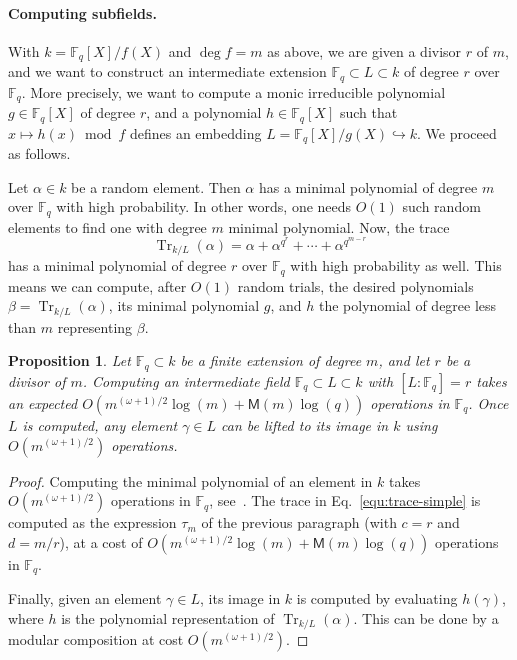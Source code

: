 \documentclass{mcom-l}
\theoremstyle{plain}
\newtheorem{proposition}[theorem]{Proposition}
\theoremstyle{definition}
\DeclareMathOperator{\trace}{Tr} %
\newcommand{\F}{\ensuremath{\mathbb{F}}}
\newcommand{\MM}{\ensuremath{\mathsf{M}}}
\begin{document}
\paragraph{\bf Computing subfields.}
With $k = \F_q[X]/f(X)$ and $\deg f=m$ as above, we are given a
divisor $r$ of $m$, and we want to construct an intermediate extension
$\F_q \subset L \subset k$ of degree $r$ over $\F_q$. More precisely,
we want to compute a monic irreducible polynomial $g \in \F_q[X]$ of
degree $r$, and a polynomial $h \in \F_q[X]$ such that
$x \mapsto h(x)\bmod f$ defines an embedding
$L = \F_q[X] / g(X) \hookrightarrow k$. We proceed as follows.

Let $\alpha\in k$ be a random element. Then $\alpha$ has a minimal polynomial of degree $m$ 
over $\F_q$ with high probability. In other words, one needs $O(1)$ such random elements to find 
one with degree $m$ minimal polynomial. Now, the trace
\begin{equation}
	\label{equ:trace-simple}
	\trace_{k/L}(\alpha) = \alpha + \alpha^{q^r} + \cdots + \alpha^{q^{m - r}}
\end{equation}
has a minimal polynomial of degree $r$ over $\F_q$ with high
probability as well. This means we can compute, after $O(1)$ random
trials, the desired polynomials $\beta = \trace_{k/L}(\alpha)$,
its minimal polynomial
$g$, and $h$ the polynomial of degree less than $m$ representing $\beta$.

\begin{proposition}
	\label{prop:subfield}
	Let $\F_q \subset k$ be a finite extension of degree $m$, and
        let $r$ be a divisor of $m$.  Computing an intermediate field
        $\F_q \subset L \subset k$ with $[L:\F_q]=r$ takes an expected
        $O(m^{(\omega+1)/2}\log(m) + \MM(m)\log(q))$ operations in $\F_q$.  Once
        $L$ is computed, any element $\gamma\in L$ can be lifted to
        its image in $k$ using $O(m^{(\omega+1)/2})$ operations.
\end{proposition}
\begin{proof}
  Computing the minimal polynomial of an element in $k$ takes
  $O(m^{(\omega+1)/2})$ operations in $\F_q$, see~\cite{shoup93}. %
  The trace in Eq.~\eqref{equ:trace-simple} is computed as the
  expression $\tau_m$ of the previous paragraph (with $c=r$ and
  $d=m/r$), at a cost of $O(m^{(\omega+1)/2}\log(m)+\MM(m)\log(q))$
  operations in $\F_q$.
  
  Finally, given an element $\gamma\in L$, its image in $k$ is
  computed by evaluating $h(\gamma)$, where $h$ is the polynomial
  representation of $\trace_{k/L}(\alpha)$. This can be done by a
  modular composition at cost $O(m^{(\omega+1)/2})$.
\end{proof}
\end{document}
